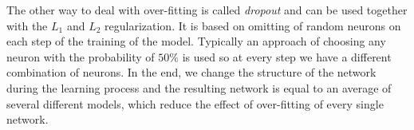The other way to deal with over-fitting is called \textit{dropout} and can be used together with the $L_{1}$ and $L_{2}$ regularization.
It is based on omitting of random neurons on each step of the training of the model.
Typically an approach of choosing any neuron with the probability of $50\%$ is used so at every step we have a different combination of neurons.
In the end, we change the structure of the network during the learning process and the resulting network is equal to an average of several different models, which reduce the effect of over-fitting of every single network.



